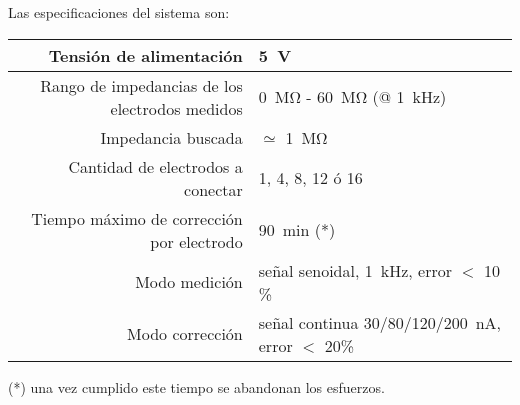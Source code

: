 Las especificaciones del sistema son:

\begin{table}[H]
\begin{center}
\begin{tabular}{|r|l|}
    \hline
    Tensión de alimentación &
    \SI{5}{\volt} \\ \hline
    Rango de impedancias de los electrodos medidos &
    \SI{0}{\mega\ohm} - \SI{60}{\mega\ohm} (@ \SI{1}{\kilo\hertz})\\ \hline
    Impedancia buscada & $\simeq$ \SI{1}{\mega\ohm}\\ \hline
    Cantidad de electrodos a conectar &
    1, 4, 8, 12 ó 16 \\ \hline
    Tiempo máximo de corrección por electrodo &
    \SI{90}{\minute} (*)\\ \hline
    Modo medición & señal senoidal, \SI{1}{\kilo\hertz}, error $<$ 10 \% \\ \hline
    Modo corrección & señal continua 30/80/120/\SI{200}{\nano\ampere}, error $<$ 20\% \\ \hline
\end{tabular}
\end{center}
\end{table}

(*) una vez cumplido este tiempo se abandonan los esfuerzos.



